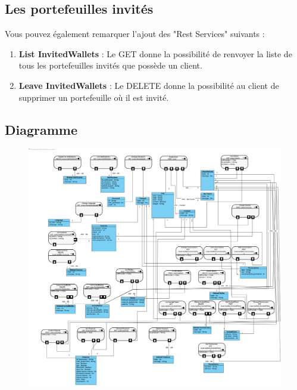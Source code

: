 \subsection{Les portefeuilles invités}
\begin{flushleft}
Vous pouvez également remarquer l'ajout des "Rest Services" suivants :
\end{flushleft}
\begin{enumerate}
\item \textbf{List InvitedWallets} :\newline
Le GET donne la possibilité de renvoyer la liste de tous les portefeuilles invités que possède un client.
\item \textbf{Leave InvitedWallets} :\newline
Le DELETE donne la possibilité au client de supprimer un portefeuille où il est invité.
\end{enumerate}


\newpage
\subsection{Diagramme}
\begin{figure}[h]
\centering
\includegraphics[width = 1\textwidth]{Extension-claire/API-claire/img/API-claire.png}
\end{figure}
